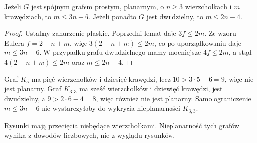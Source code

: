 \begin{twierdzenie}
\label{thm:tg-planarne-bound}
Jeżeli $G$ jest spójnym grafem prostym, planarnym,
o $n\ge3$ wierzchołkach i $m$ krawędziach, to
$m\le3n-6$. Jeżeli ponadto $G$ jest dwudzielny,
to $m\le2n-4$.
\end{twierdzenie}

\begin{proof}
Ustalmy zanurzenie płaskie. Poprzedni lemat daje
$3f\le2m$. Ze wzoru Eulera $f=2-n+m$,
więc $3(2-n+m)\le2m$, co po uporządkowaniu
daje $m\le3n-6$. W przypadku grafu dwudzielnego
mamy mocniejsze $4f\le2m$, a stąd
$4(2-n+m)\le2m$ oraz $m\le2n-4$.
\end{proof}

\begin{przyklad}
Graf $K_5$ ma pięć wierzchołków i dziesięć krawędzi,
lecz $10>3\cdot5-6=9$, więc nie jest planarny.
Graf $K_{3,3}$ ma sześć wierzchołków i dziewięć krawędzi,
jest dwudzielny, a $9>2\cdot6-4=8$, więc również
nie jest planarny. Samo ograniczenie $m\le3n-6$
nie wystarczyłoby do wykrycia nieplanarności $K_{3,3}$.
\end{przyklad}

\begin{center}

{\footnotesize Rysunki mają przecięcia niebędące wierzchołkami.
Nieplanarność tych grafów wynika z dowodów liczbowych, nie z wyglądu rysunków.}
\end{center}

